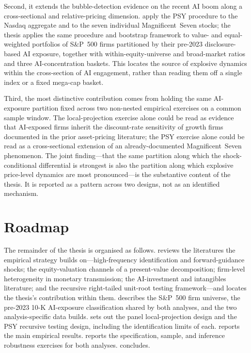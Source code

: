 Second, it extends the bubble-detection evidence on the recent AI
boom along a cross-sectional and relative-pricing dimension.
\citet{baselePhillipsShi2025} apply the PSY procedure to the
Nasdaq aggregate and to the seven individual Magnificent~Seven
stocks; the thesis applies the same procedure and bootstrap
framework to value- and equal-weighted portfolios of S\&P~500
firms partitioned by their pre-2023 disclosure-based AI exposure,
together with within-equity-universe and broad-market ratios and
three AI-concentration baskets. This locates the source of
explosive dynamics within the cross-section of AI engagement,
rather than reading them off a single index or a fixed mega-cap
basket.

Third, the most distinctive contribution comes from holding the
same AI-exposure partition fixed across two non-nested empirical
exercises on a common sample window. The local-projection
exercise alone could be read as evidence that AI-exposed firms
inherit the discount-rate sensitivity of growth firms documented
in the prior asset-pricing literature; the PSY exercise alone
could be read as a cross-sectional extension of an
already-documented Magnificent~Seven phenomenon. The joint
finding---that the same partition along which the
shock-conditional differential is strongest is also the partition
along which explosive price-level dynamics are most
pronounced---is the substantive content of the thesis. It is
reported as a pattern across two designs, not as an identified
mechanism.


\section{Roadmap}
\label{sec:intro-roadmap}

The remainder of the thesis is organised as follows.
 reviews the literatures the empirical
strategy builds on---high-frequency identification and
forward-guidance shocks; the equity-valuation channels of a
present-value decomposition; firm-level heterogeneity in
monetary transmission; the AI-investment and intangibles
literature; and the recursive right-tailed unit-root testing
framework---and locates the thesis's contribution within them.
 describes the S\&P~500 firm universe, the
pre-2023 10-K AI-exposure classification shared by both
analyses, and the two analysis-specific data builds.
 sets out the panel local-projection
design and the PSY recursive testing design, including the
identification limits of each.  reports the
main empirical results.  reports the
specification, sample, and inference robustness exercises for
both analyses.  concludes.